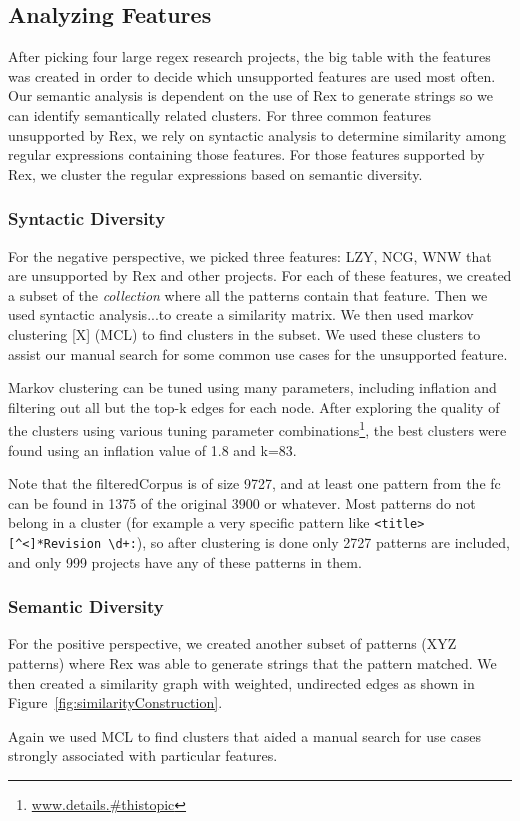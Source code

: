 \subsection{Analyzing Features}
\label{study:features}

After picking four large regex research projects, the big table with the features was created in order to decide which unsupported features are used most often.
Our semantic analysis is dependent on the use of Rex to generate strings so we can identify semantically related clusters. For three common features unsupported by Rex, we rely on syntactic analysis to determine similarity among regular expressions containing those features. For those features supported by Rex, we cluster the regular expressions based on semantic diversity.

\subsubsection{Syntactic Diversity}
For the negative perspective, we picked three features: LZY, NCG, WNW that are unsupported by Rex and other projects.  For each of these features, we created a subset of the \emph{collection} where all the patterns contain that feature.  Then we used syntactic analysis...to create a similarity matrix.  We then used markov clustering [X] (MCL) to find clusters in the subset.  We used these clusters to assist our manual search for some common use cases for the unsupported feature.

Markov clustering can be tuned using many parameters, including inflation and filtering out all but the top-k edges for each node.  After exploring the quality of the clusters using various tuning parameter combinations\footnote{\url{www.details.#thistopic}}, the best clusters were found using an inflation value of 1.8 and k=83.

Note that the filteredCorpus is of size 9727, and at least one pattern from the fc can be found in 1375 of the original 3900 or whatever.  Most patterns do not belong in a cluster (for example a very specific pattern like \verb!<title>[^<]*Revision \d+:!), so after clustering is done only 2727 patterns are included, and only 999 projects have any of these patterns in them.


\subsubsection{Semantic Diversity}
For the positive perspective, we created another subset of patterns (XYZ patterns) where Rex was able to generate strings that the pattern matched.  We then created a similarity graph with weighted, undirected edges as shown in Figure~\ref{fig:similarityConstruction}.



Again we used MCL to find clusters that aided a manual search for use cases strongly associated with particular features.











